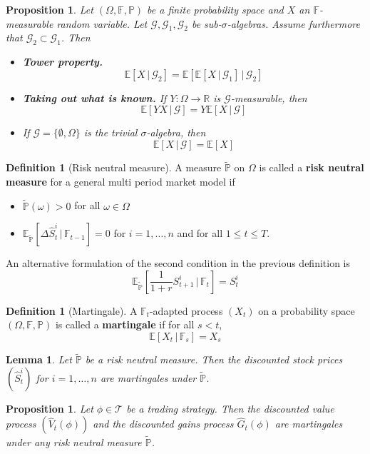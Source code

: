 \documentclass[10pt, oneside, reqno]{amsart}
\theoremstyle{plain}%
\newtheorem{lem}[thm]{Lemma}
\newtheorem{prop}[thm]{Proposition}
\theoremstyle{definition}
\newtheorem{defn}[thm]{Definition}
\theoremstyle{remark}
\newcommand{\expc}[1]{\mathbb{E}\left[#1\right]}
\newcommand{\expp}[1]{\mathbb{E}_{\rnm}\left[#1\right]}
\newcommand{\given}{ \, | \,}
\newcommand{\R}{\mathbb{R}}
\newcommand{\F}{\mathbb{F}}
\newcommand{\rnm}{\tilde{\mathbb{P}}}
\begin{document}
\begin{prop}
Let $(\Omega, \F, \mathbb{P})$ be a finite probability space and $X$ an $\F$-measurable random variable.  Let $\mathcal{G},\mathcal{G}_1,\mathcal{G}_2$ be sub-$\sigma$-algebras.  Assume furthermore that $\mathcal{G}_2 \subset \mathcal{G}_1$.  Then
\begin{itemize}
	\item \textbf{Tower property.}\[
		\expc{X \given \mathcal{G}_2} = \expc{\expc{X \given \mathcal{G}_1} \given \mathcal{G}_2}
	\]
	\item \textbf{Taking out what is known.}  If $Y:\Omega \rightarrow \R$ is $\mathcal{G}$-measurable, then \[
		\expc{YX \given \mathcal{G}} = Y \expc{X \given \mathcal{G}}
	\]
	\item If $\mathcal{G} = \{ \emptyset, \Omega \}$ is the trivial $\sigma$-algebra, then \[
		\expc{X \given \mathcal{G}} = \expc{X}
	\]
\end{itemize}
\end{prop}


\begin{defn}[Risk neutral measure]
	A measure $\rnm$ on $\Omega$ is called a \textbf{risk neutral measure} for a general multi period market model if 
	\begin{itemize}
		\item $\rnm(\omega) > 0$ for all $\omega \in \Omega$
		\item $\expp{\Delta \hat{S}^i_t \given \F_{t-1}} = 0$ for $i = 1,\dots,n$ and for all $1 \leq t \leq T$.
	\end{itemize}
\end{defn}

An alternative formulation of the second condition in the previous definition is \[
	\expp{\frac{1}{1+r}S^i_{t+1} \given \F_t} = S^i_t
\]

\begin{defn}[Martingale]
	A $\F_t$-adapted process $(X_t)$ on a probability space $(\Omega, \F, \mathbb{P})$ is called a \textbf{martingale} if for all $s < t$, \[
		\expc{X_t \given \F_s} = X_s
	\]
\end{defn}

\begin{lem}
	Let $\rnm$ be a risk neutral measure.  Then the discounted stock prices $(\hat{S}^i_t)$ for $i = 1,\dots,n$ are martingales under $\rnm$.
\end{lem}

\begin{prop}Let $\phi \in \mathcal{T}$ be a trading strategy.  Then the discounted value process $(\hat{V}_t(\phi))$ and the discounted gains process $\hat{G}_t(\phi)$ are martingales under any risk neutral measure $\rnm$.
	
\end{prop}
\end{document}
